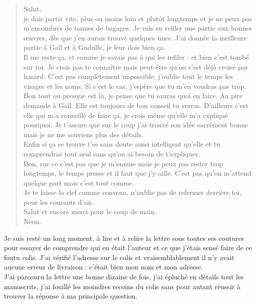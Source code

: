 \begin{quote}
Salut, \\

je dois partir vite, plus ou moins loin et plutôt longtemps et je ne peux pas m'encombrer de tonnes de bagages. Je vais en refiler une partie aux bonnes œuvres, dès que j'en aurais trouvé quelques unes. J'ai donnée la meilleure partie à Gaïl et à Gudulle, je leur dois bien ça. \\

Il me reste ça, et comme je savais pas à qui les refiler : et bien c'est tombé sur toi. Je crois pas te connaître mais peut-être qu'on s'est déjà croisé par hasard. C'est pas complètement impossible, j'oublie tout le temps les visages et les noms. Si c'est le cas, j'espère que tu m'en voudras pas trop. \\
Bon tout ou presque est là, je pense que tu sauras quoi en faire. Au pire demande à Gaïl. Elle est toujours de bon conseil tu verras. D'ailleurs c'est elle qui m'a conseillé de faire ça, je crois même qu'elle m'a expliqué pourquoi. Je t'assure que sur le coup j'ai trouvé son idée sacrément bonne mais je ne me souviens plus des détails. \\
Enfin si ça se trouve t'es sans doute aussi intelligent qu'elle et tu comprendras tout seul sans qu'on ai besoin de t'expliquer. \\

Bon, sur ce c'est pas que je m'ennuie mais je peux pas rester trop longtemps, le temps presse et il faut que j'y aille. C'est pas qu'on m'attend quelque part mais c'est tout comme.\\

Je te laisse la clef comme convenu, n'oublie pas de refermer derrière toi, pour les courants d'air.\\

Salut et encore merci pour le coup de main.\\
Neon.\\
\end{quote}

Je suis resté un long moment, à lire et à relire la lettre sous toutes ses coutures pour essayer de comprendre qui en était l'auteur et ce que j'étais sensé faire de ce foutu colis. J'ai vérifié l'adresse sur le colis et vraisemblablement il n'y avait aucune erreur de livraison : c'était bien mon nom et mon adresse. \\

J'ai parcouru la lettre une bonne dizaine de fois, j'ai épluché en détails tout les manuscrits, j'ai fouillé les moindres recoins du colis sans pour autant réussir à trouver la réponse à ma principale question.\\

